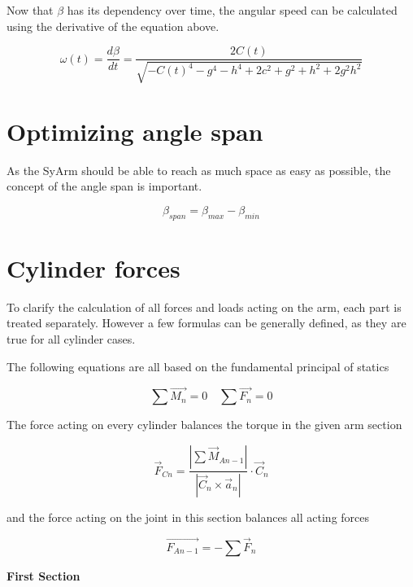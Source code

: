 \documentclass{article}
\begin{document}
    Now that $\beta$ has its dependency over time, the angular speed can be calculated using the derivative of the equation above.
    
    \begin{equation}
        \omega(t) = \frac{d\beta}{dt} = \frac{2 C(t)}{\sqrt{- C(t)^4 - g^4 - h^4 + 2c^2 + g^2 + h^2 + 2 g^2 h^2}}
    \end{equation}

\section{Optimizing angle span}
    As the SyArm should be able to reach as much space as easy as possible, the concept of the angle span is important. 
    
    \begin{equation}
        \beta_{span} = \beta_{max} - \beta_{min}
    \end{equation}
    
\section{Cylinder forces}
    To clarify the calculation of all forces and loads acting on the arm, each part is treated separately. However a few formulas can be generally defined, as they are true for all cylinder cases.
    
    The following equations are all based on the fundamental principal of statics
    
    \begin{equation}
        \sum \vec{M_n} = 0 \quad \sum \vec{F_n} = 0
    \end{equation}
    
    The force acting on every cylinder balances the torque in the given arm section
    
    \begin{equation}
        \vec F_{Cn}  = \frac{|\sum \vec M_{A n - 1} |}{| \vec C_n \times \vec a_n |} \cdot \vec C_n
    \end{equation}
    
    and the force acting on the joint in this section balances all acting forces
    
    \begin{equation}
        \vec{F_{An - 1}} = - \sum \vec F_n
    \end{equation}
    
    \textbf{First Section}
    
\end{document}
